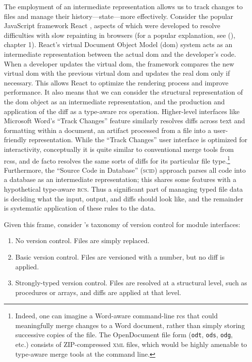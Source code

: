 \documentclass[twoside]{article}
\begin{document}
\noindent
The employment of an intermediate representation allows us to track changes to files and manage their history—state—more effectively.  Consider the popular JavaScript framework React \citep{React}, aspects of which were developed to resolve difficulties with slow repainting in browsers (for a popular explanation, see \citeauthor{Baer2018} (\citeyear{Baer2018}), chapter 1).  React's virtual Document Object Model ({\sc dom}) system acts as an intermediate representation between the actual {\sc dom} and the developer's code.  When a developer updates the virtual {\sc dom}, the framework compares the new virtual {\sc dom} with the previous virtual {\sc dom} and updates the real {\sc dom} only if necessary.  This allows React to optimize the rendering process and improve performance.  It also means that we can consider the structural representation of the {\sc dom} object as an intermediate representation, and the production and application of the diff as a type-aware {\sc rcs} operation.  Higher-level interfaces like Microsoft Word's “Track Changes” feature \citep{MS2024} similarly resolves diffs across text and formatting within a document, an artifact processed from a file into a user-friendly representation.  While the “Track Changes” user interface is optimized for interactivity, conceptually it is quite similar to conventional merge tools from {\sc rcs}s, and de facto resolves the same sorts of diffs for its particular file type.\footnote{Indeed, one can imagine a Word-aware command-line {\sc rcs} that could meaningfully merge changes to a Word document, rather than simply storing successive copies of the file.  The OpenDocument file form (\texttt{odt}, \texttt{ods}, \texttt{odg}, etc.) consists of \textsc{ZIP}-compressed \textsc{xml} files, which would be highly amenable to type-aware merge tools at the command line.}  Furthermore, the ``Source Code in Database'' (\textsc{scid}) approach parses all code into a database as an intermediate representation; this shares some features with a hypothetical type-aware \textsc{rcs}.  Thus a significant part of managing typed file data is deciding what the input, output, and diffs should look like, and the remainder is systematic application of these rules to the data.

Given this frame, consider \citeauthor{Perry1987}'s taxonomy of version control for module interfaces:

\begin{enumerate}
  \item  No version control.  Files are simply replaced.
  \item  Basic version control.  Files are versioned with a number, but no diff is applied.
  \item  Strongly-typed version control.  Files are resolved at a structural level, such as procedures or arrays, and diffs are applied at that level.
\end{enumerate}
\end{document}
